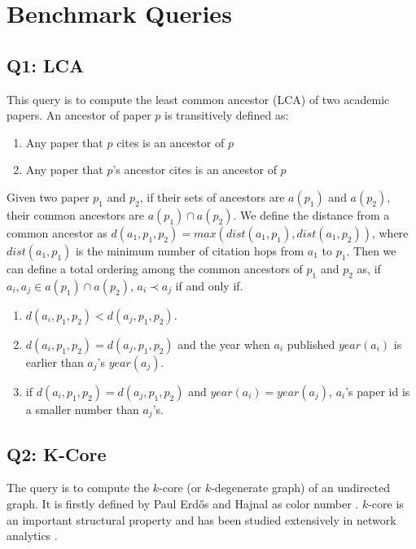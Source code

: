 \section{Benchmark Queries}
\label{sec:benchmark}

\subsection{Q1: LCA}
This query is to compute the least common ancestor (LCA) of two 
academic papers. An ancestor of paper $p$ is transitively defined as:

\begin{enumerate}
    \item Any paper that $p$ cites is an ancestor of $p$
    \item Any paper that $p$'s ancestor cites is an ancestor of $p$
\end{enumerate} 

Given two paper $p_1$ and $p_2$, if their sets of ancestors are 
$a(p_1)$ and $a(p_2)$, their common ancestors are 
$a(p_1) \cap a(p_2)$. We define the distance from a common ancestor
as $d(a_1, p_1, p_2) = max(dist(a_1, p_1), dist(a_1, p_2))$, where 
$dist(a_1, p_1)$ is the minimum number of citation hops from $a_1$ to 
$p_1$. Then we can define a total ordering among the common ancestors
of $p_1$ and $p_2$ as, if $a_i, a_j \in a(p_1) \cap a(p_2)$, 
$a_i \prec a_j$ if and only if.

\begin{enumerate}
    \item $d(a_i, p_1, p_2) < d(a_j, p_1, p_2)$.
    \item $d(a_i, p_1, p_2) = d(a_j, p_1, p_2)$ and the year when $a_i$
    published $year(a_i)$ is earlier than $a_j$'s $year(a_j)$.
    \item if $d(a_i, p_1, p_2) = d(a_j, p_1, p_2)$ and $year(a_i) = year(a_j)$, $a_i$'s paper id is a smaller number than $a_j$'s.
\end{enumerate}

\subsection{Q2: K-Core}

The query is to compute the $k$-core (or $k$-degenerate graph) 
of an undirected graph. It is firstly defined by Paul Erd\H{o}s 
and Hajnal as color number \cite{ErdosH66}. 
$k$-core is an important structural property
and has been studied extensively in network analytics 
\cite{Alvarez-HamelinDBV05NIPS, ChengKCO11ICDE}.

